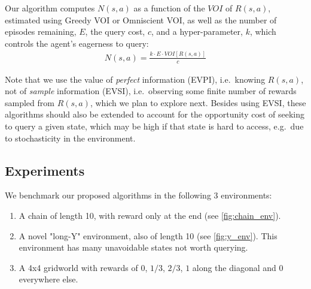\documentclass{article}
\begin{document}
Our algorithm computes $N(s,a)$ as a function of the $\mathit{VOI}$ of $R(s,a)$, estimated using Greedy VOI or Omniscient VOI, as well as 
the number of episodes remaining, $E$, the query cost, $c$, and a hyper-parameter, $k$, which controls the agent's eagerness to query:
\begin{align}
N(s,a) = \frac {k \cdot E \cdot \mathit{VOI}[R(s,a)] } {c} 
\end{align}

Note that we use the value of {\it perfect} information (EVPI), i.e.\ knowing $R(s,a)$, not of {\it sample} information (EVSI), i.e.\ observing some finite number of rewards sampled from $R(s,a)$, which we plan to explore next.
Besides using EVSI, these algorithms should also be extended to account for the opportunity cost of seeking to query a given state, which may be high if that state is hard to access, e.g.\ due to stochasticity in the environment.



















\subsection{Experiments}

We benchmark our proposed algorithms in the following 3 environments:
\begin{enumerate}
\item A chain of length 10, with reward only at the end  (see \autoref{fig:chain_env}).
\item A novel "long-Y" environment, also of length 10 (see \autoref{fig:y_env}). This environment has many unavoidable states not worth querying.
\item A 4x4 gridworld with rewards of $0$, $1/3$, $2/3$, $1$ along the diagonal and $0$ everywhere else.
\end{enumerate}
\end{document}
